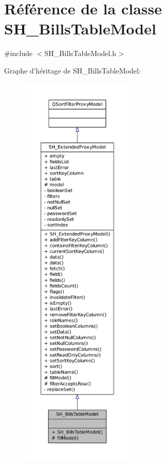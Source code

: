 \hypertarget{classSH__BillsTableModel}{\section{Référence de la classe S\-H\-\_\-\-Bills\-Table\-Model}
\label{classSH__BillsTableModel}
}


{\ttfamily \#include $<$S\-H\-\_\-\-Bills\-Table\-Model.\-h$>$}



Graphe d'héritage de S\-H\-\_\-\-Bills\-Table\-Model\-:
\nopagebreak
\begin{figure}[H]
\begin{center}
\leavevmode
\includegraphics[height=550pt]{classSH__BillsTableModel__inherit__graph}
\end{center}
\end{figure}


